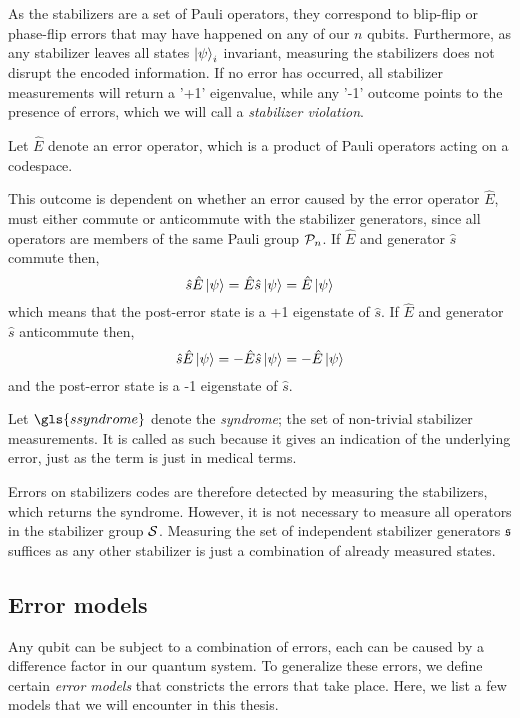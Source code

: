 As the stabilizers are a set of Pauli operators, they correspond to blip-flip or phase-flip errors that may have happened on any of our $n$ qubits. Furthermore, as any stabilizer leaves all states  $\ket{\psi}_i$ invariant, measuring the stabilizers does not disrupt the encoded information. If no error has occurred, all stabilizer measurements will return a '+1' eigenvalue, while any '-1' outcome points to the presence of errors, which we will call a \emph{stabilizer violation}.
\begin{definition}
  Let $\hat{E}$ denote an error operator, which is a product of Pauli operators acting on a codespace. 
\end{definition}
This outcome is dependent on whether an error caused by the error operator $\hat{E}$, must either commute or anticommute with the stabilizer generators, since all operators are members of the same Pauli group $\mathcal{P}_n$. If $\hat{E}$ and generator $\hat{s}$ commute then,
\begin{equation}
  \hat{s}\hat{E}\ket{\psi} = \hat{E}\hat{s}\ket{\psi} = \hat{E}\ket{\psi}
\end{equation}
which means that the post-error state is a +1 eigenstate of $\hat{s}$. If $\hat{E}$ and generator $\hat{s}$ anticommute then,
\begin{equation}\label{qec:eq:stabmeas}
  \hat{s}\hat{E}\ket{\psi} = -\hat{E}\hat{s}\ket{\psi} = -\hat{E}\ket{\psi}
\end{equation}
and the post-error state is a -1 eigenstate of $\hat{s}$. 
\begin{definition}\label{def:syndrome}
  Let $\gls{ssyndrome}$ denote the \emph{syndrome}; the set of non-trivial stabilizer measurements. It is called as such because it gives an indication of the underlying error, just as the term is just in medical terms. 
\end{definition}
Errors on stabilizers codes are therefore detected by measuring the stabilizers, which returns the syndrome. However, it is not necessary to measure all operators in the stabilizer group $\mathcal{S}$. Measuring the set of independent stabilizer generators $\mathfrak{s}$ suffices as any other stabilizer is just a combination of already measured states.

\subsection{Error models}\label{qec:sec_errormodels}
Any qubit can be subject to a combination of errors, each can be caused by a difference factor in our quantum system. To generalize these errors, we define certain \emph{error models} that constricts the errors that take place. Here, we list a few models that we will encounter in this thesis. 

